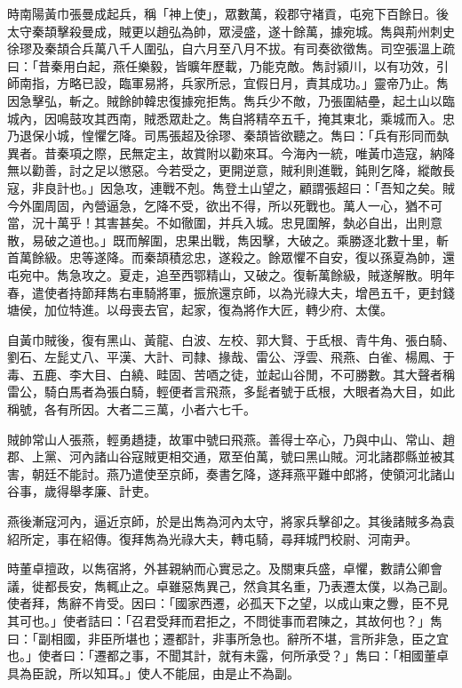 \begin{pinyinscope}
時南陽黃巾張曼成起兵，稱「神上使」，眾數萬，殺郡守褚貢，屯宛下百餘日。後太守秦頡擊殺曼成，賊更以趙弘為帥，眾浸盛，遂十餘萬，據宛城。雋與荊州刺史徐璆及秦頡合兵萬八千人圍弘，自六月至八月不拔。有司奏欲徵雋。司空張溫上疏曰：「昔秦用白起，燕任樂毅，皆曠年歷載，乃能克敵。雋討潁川，以有功效，引師南指，方略已設，臨軍易將，兵家所忌，宜假日月，責其成功。」靈帝乃止。雋因急擊弘，斬之。賊餘帥韓忠復據宛拒雋。雋兵少不敵，乃張圍結壘，起土山以臨城內，因鳴鼓攻其西南，賊悉眾赴之。雋自將精卒五千，掩其東北，乘城而入。忠乃退保小城，惶懼乞降。司馬張超及徐璆、秦頡皆欲聽之。雋曰：「兵有形同而埶異者。昔秦項之際，民無定主，故賞附以勸來耳。今海內一統，唯黃巾造寇，納降無以勸善，討之足以懲惡。今若受之，更開逆意，賊利則進戰，鈍則乞降，縱敵長寇，非良計也。」因急攻，連戰不剋。雋登土山望之，顧謂張超曰：「吾知之矣。賊今外圍周固，內營逼急，乞降不受，欲出不得，所以死戰也。萬人一心，猶不可當，況十萬乎！其害甚矣。不如徹圍，并兵入城。忠見圍解，埶必自出，出則意散，易破之道也。」既而解圍，忠果出戰，雋因擊，大破之。乘勝逐北數十里，斬首萬餘級。忠等遂降。而秦頡積忿忠，遂殺之。餘眾懼不自安，復以孫夏為帥，還屯宛中。雋急攻之。夏走，追至西鄂精山，又破之。復斬萬餘級，賊遂解散。明年春，遣使者持節拜雋右車騎將軍，振旅還京師，以為光祿大夫，增邑五千，更封錢塘侯，加位特進。以母喪去官，起家，復為將作大匠，轉少府、太僕。

自黃巾賊後，復有黑山、黃龍、白波、左校、郭大賢、于氐根、青牛角、張白騎、劉石、左髭丈八、平漢、大計、司隸、掾哉、雷公、浮雲、飛燕、白雀、楊鳳、于毒、五鹿、李大目、白繞、畦固、苦唒之徒，並起山谷閒，不可勝數。其大聲者稱雷公，騎白馬者為張白騎，輕便者言飛燕，多髭者號于氐根，大眼者為大目，如此稱號，各有所因。大者二三萬，小者六七千。

賊帥常山人張燕，輕勇趫捷，故軍中號曰飛燕。善得士卒心，乃與中山、常山、趙郡、上黨、河內諸山谷寇賊更相交通，眾至伯萬，號曰黑山賊。河北諸郡縣並被其害，朝廷不能討。燕乃遣使至京師，奏書乞降，遂拜燕平難中郎將，使領河北諸山谷事，歲得舉孝廉、計吏。

燕後漸寇河內，逼近京師，於是出雋為河內太守，將家兵擊卻之。其後諸賊多為袁紹所定，事在紹傳。復拜雋為光祿大夫，轉屯騎，尋拜城門校尉、河南尹。

時董卓擅政，以雋宿將，外甚親納而心實忌之。及關東兵盛，卓懼，數請公卿會議，徙都長安，雋輒止之。卓雖惡雋異己，然貪其名重，乃表遷太僕，以為己副。使者拜，雋辭不肯受。因曰：「國家西遷，必孤天下之望，以成山東之釁，臣不見其可也。」使者詰曰：「召君受拜而君拒之，不問徙事而君陳之，其故何也？」雋曰：「副相國，非臣所堪也；遷都計，非事所急也。辭所不堪，言所非急，臣之宜也。」使者曰：「遷都之事，不聞其計，就有未露，何所承受？」雋曰：「相國董卓具為臣說，所以知耳。」使人不能屈，由是止不為副。


\end{pinyinscope}
